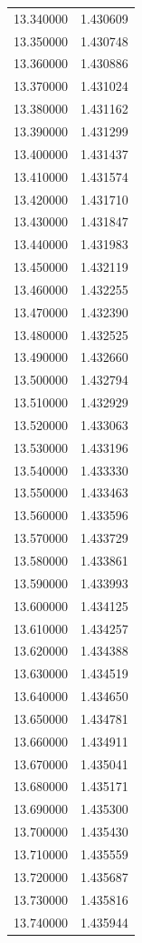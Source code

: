 \begin{tabular}{rr}
13.340000 & 1.430609 \\
13.350000 & 1.430748 \\
13.360000 & 1.430886 \\
13.370000 & 1.431024 \\
13.380000 & 1.431162 \\
13.390000 & 1.431299 \\
13.400000 & 1.431437 \\
13.410000 & 1.431574 \\
13.420000 & 1.431710 \\
13.430000 & 1.431847 \\
13.440000 & 1.431983 \\
13.450000 & 1.432119 \\
13.460000 & 1.432255 \\
13.470000 & 1.432390 \\
13.480000 & 1.432525 \\
13.490000 & 1.432660 \\
13.500000 & 1.432794 \\
13.510000 & 1.432929 \\
13.520000 & 1.433063 \\
13.530000 & 1.433196 \\
13.540000 & 1.433330 \\
13.550000 & 1.433463 \\
13.560000 & 1.433596 \\
13.570000 & 1.433729 \\
13.580000 & 1.433861 \\
13.590000 & 1.433993 \\
13.600000 & 1.434125 \\
13.610000 & 1.434257 \\
13.620000 & 1.434388 \\
13.630000 & 1.434519 \\
13.640000 & 1.434650 \\
13.650000 & 1.434781 \\
13.660000 & 1.434911 \\
13.670000 & 1.435041 \\
13.680000 & 1.435171 \\
13.690000 & 1.435300 \\
13.700000 & 1.435430 \\
13.710000 & 1.435559 \\
13.720000 & 1.435687 \\
13.730000 & 1.435816 \\
13.740000 & 1.435944 \\

\end{tabular}
